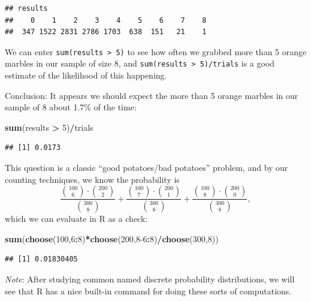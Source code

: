 \documentclass[
]{book}
\newenvironment{Shaded}{\begin{snugshade}}{\end{snugshade}}
\newcommand{\DecValTok}[1]{\textcolor[rgb]{0.00,0.00,0.81}{#1}}
\newcommand{\FunctionTok}[1]{\textcolor[rgb]{0.13,0.29,0.53}{\textbf{#1}}}
\newcommand{\NormalTok}[1]{#1}
\newcommand{\SpecialCharTok}[1]{\textcolor[rgb]{0.81,0.36,0.00}{\textbf{#1}}}
\theoremstyle{definition}
\theoremstyle{definition}
\theoremstyle{definition}
\theoremstyle{definition}
\theoremstyle{remark}
\begin{document}
\begin{verbatim}
## results
##    0    1    2    3    4    5    6    7    8 
##  347 1522 2831 2786 1703  638  151   21    1
\end{verbatim}

We can enter \texttt{sum(results\ \textgreater{}\ 5)} to see how often we grabbed more than 5 orange marbles in our sample of size 8, and \texttt{sum(results\ \textgreater{}\ 5)/trials} is a good estimate of the likelihood of this happening.

Conclusion: It appears we should expect the more than 5 orange marbles in our sample of 8 about 1.7\% of the time:

\begin{Shaded}
\begin{Highlighting}[]
\FunctionTok{sum}\NormalTok{(results }\SpecialCharTok{\textgreater{}} \DecValTok{5}\NormalTok{)}\SpecialCharTok{/}\NormalTok{trials}
\end{Highlighting}
\end{Shaded}

\begin{verbatim}
## [1] 0.0173
\end{verbatim}

This question is a classic ``good potatoes/bad potatoes'' problem, and by our counting techniques, we know the probability is \[\frac{\binom{100}{6}\cdot\binom{200}{2}}{\binom{300}{8}}+
\frac{\binom{100}{7}\cdot\binom{200}{1}}{\binom{300}{8}}+
\frac{\binom{100}{8}\cdot\binom{200}{0}}{\binom{300}{8}},\]
which we can evaluate in R as a check:

\begin{Shaded}
\begin{Highlighting}[]
\FunctionTok{sum}\NormalTok{(}\FunctionTok{choose}\NormalTok{(}\DecValTok{100}\NormalTok{,}\DecValTok{6}\SpecialCharTok{:}\DecValTok{8}\NormalTok{)}\SpecialCharTok{*}\FunctionTok{choose}\NormalTok{(}\DecValTok{200}\NormalTok{,}\DecValTok{8{-}6}\SpecialCharTok{:}\DecValTok{8}\NormalTok{)}\SpecialCharTok{/}\FunctionTok{choose}\NormalTok{(}\DecValTok{300}\NormalTok{,}\DecValTok{8}\NormalTok{))}
\end{Highlighting}
\end{Shaded}

\begin{verbatim}
## [1] 0.01830405
\end{verbatim}

\emph{Note}: After studying common named discrete probability distributions, we will see that R has a nice built-in command for doing these sorts of computations.
\end{document}
